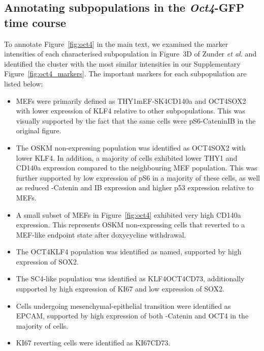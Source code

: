 \documentclass{article}
\begin{document}
\subsection{Annotating subpopulations in the \textit{Oct4}-GFP time course}
To annotate Figure~\ref{fig:oct4} in the main text, we examined the marker intensities of each characterised subpopulation in Figure~3D of Zunder \emph{et al.} \cite{zunder2015continuous} and identified the cluster with the most similar intensities in our Supplementary Figure~\ref{fig:oct4_markers}.
The important markers for each subpopulation are listed below:
\begin{itemize}
    \item MEFs were primarily defined as THY1\hi{}mEF-SK4\hi{}CD140a\hi{} and OCT4\lo{}SOX2\lo{} with lower expression of KLF4 relative to other subpopulations.
        This was visually supported by the fact that the same cells were pS6\hi{}\textbeta-Catenin\hi{}I\textkappa{}B\textalpha\hi{} in the original figure.
    \item The OSKM non-expressing population was identified as OCT4\lo{}SOX2\lo{} with lower KLF4.
        In addition, a majority of cells exhibited lower THY1 and CD140a expression compared to the neighbouring MEF population.
        This was further supported by low expression of pS6 in a majority of these cells, as well as reduced \textbeta-Catenin and I\textkappa{}B\textalpha{} expression and higher p53 expression relative to MEFs.
    \item A small subset of MEFs in Figure~\ref{fig:oct4} exhibited very high CD140a expression.
This represents OSKM non-expressing cells that reverted to a MEF-like endpoint state after doxycycline withdrawal.
    \item The OCT4\hi{}KLF4\hi{} population was identified as named, supported by high expression of SOX2.
    \item The SC4-like population was identified as KLF4\hi{}OCT4\hi{}CD73\hi{}, additionally supported by high expression of KI67 and low expression of SOX2.
    \item Cells undergoing mesenchymal-epithelial transition were identified as EPCAM\hi{}, supported by high expression of both \textbeta-Catenin and OCT4 in the majority of cells.
    \item KI67\lo{} reverting cells were identified as KI67\lo{}CD73\hi{}.

\end{itemize}
\end{document}
